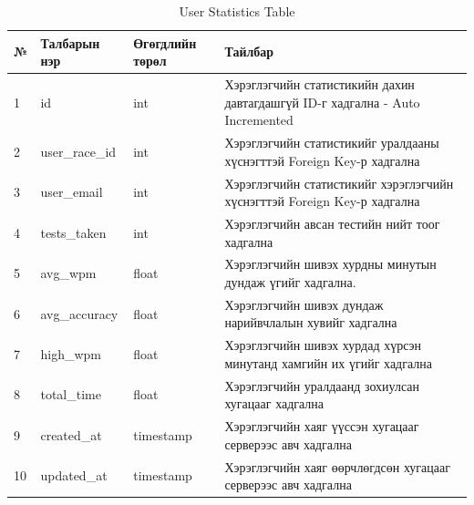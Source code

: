 \begin{table}[h]
	\caption{User Statistics Table}
	\begin{tabular}{|l|l|l|p{8cm}|}
		\hline
		№  & Талбарын нэр   & Өгөгдлийн төрөл & Тайлбар                                                                       \\ \hline
		1  & id             & int             & Хэрэглэгчийн статистикийн дахин давтагдашгүй ID-г хадгална - Auto Incremented \\ \hline
		2  & user\_race\_id & int             & Хэрэглэгчийн статистикийг уралдааны хүснэгттэй Foreign Key-р хадгална         \\ \hline
		3  & user\_email    & int             & Хэрэглэгчийн статистикийг хэрэглэгчийн хүснэгттэй Foreign Key-р хадгална      \\ \hline
		4  & tests\_taken   & int             & Хэрэглэгчийн авсан тестийн нийт тоог хадгална                                 \\ \hline
		5  & avg\_wpm       & float           & Хэрэглэгчийн шивэх хурдны минутын дундаж үгийг хадгална.                      \\ \hline
		6  & avg\_accuracy  & float           & Хэрэглэгчийн шивэх дундаж нарийвчлалын хувийг хадгална                        \\ \hline
		7  & high\_wpm      & float           & Хэрэглэгчийн шивэх хурдад хүрсэн минутанд хамгийн их үгийг хадгална           \\ \hline
		8  & total\_time    & float           & Хэрэглэгчийн уралдаанд зохиулсан хугацааг хадгална                            \\ \hline
		9  & created\_at    & timestamp       & Хэрэглэгчийн хаяг үүссэн хугацааг серверээс авч хадгална                      \\ \hline
		10 & updated\_at    & timestamp       & Хэрэглэгчийн хаяг өөрчлөгдсөн хугацааг серверээс авч хадгална                 \\ \hline
	\end{tabular}
\end{table}


